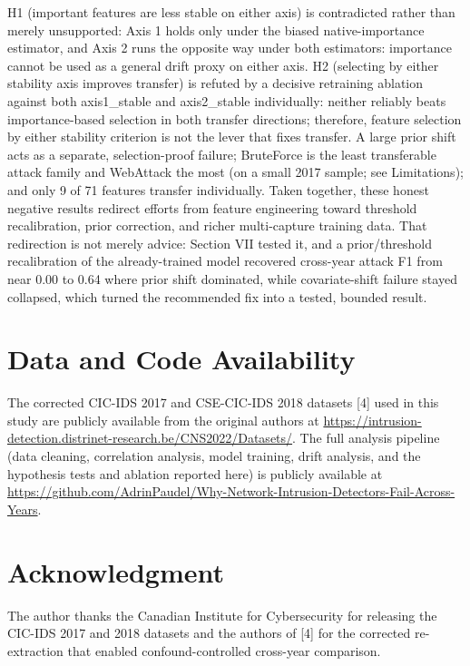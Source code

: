 \documentclass[conference]{IEEEtran}
\begin{document}
H1 (important features are less stable on either axis) is contradicted rather than merely unsupported: Axis 1 holds only under the biased native-importance estimator, and Axis 2 runs the opposite way under both estimators: importance cannot be used as a general drift proxy on either axis. H2 (selecting by either stability axis improves transfer) is refuted by a decisive retraining ablation against both axis1\_\allowbreak{}stable and axis2\_\allowbreak{}stable individually: neither reliably beats importance-based selection in both transfer directions; therefore, feature selection by either stability criterion is not the lever that fixes transfer. A large prior shift acts as a separate, selection-proof failure; BruteForce is the least transferable attack family and WebAttack the most (on a small 2017 sample; see Limitations); and only 9 of 71 features transfer individually. Taken together, these honest negative results redirect efforts from feature engineering toward threshold recalibration, prior correction, and richer multi-capture training data. That redirection is not merely advice: Section VII tested it, and a prior/threshold recalibration of the already-trained model recovered cross-year attack F1 from near 0.00 to 0.64 where prior shift dominated, while covariate-shift failure stayed collapsed, which turned the recommended fix into a tested, bounded result.
\par\medskip

\section{Data and Code Availability}

The corrected CIC-IDS 2017 and CSE-CIC-IDS 2018 datasets [4] used in this study are publicly available from the original authors at \url{https://intrusion-detection.distrinet-research.be/CNS2022/Datasets/}. The full analysis pipeline (data cleaning, correlation analysis, model training, drift analysis, and the hypothesis tests and ablation reported here) is publicly available at \url{https://github.com/AdrinPaudel/Why-Network-Intrusion-Detectors-Fail-Across-Years}.
\par\medskip

\section{Acknowledgment}

The author thanks the Canadian Institute for Cybersecurity for releasing the CIC-IDS 2017 and 2018 datasets and the authors of [4] for the corrected re-extraction that enabled confound-controlled cross-year comparison.
\par\medskip
\end{document}
